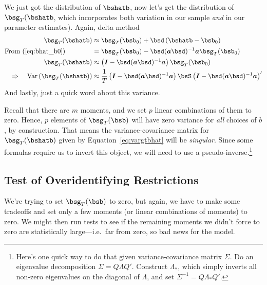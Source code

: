 \documentclass[12pt]{article}
\theoremstyle{plain}
\theoremstyle{definition}
\theoremstyle{remark}
\begin{document}
\begin{enumerate}
    We just got the distribution of $\bshatb$, now let's
    get the distribution of $\bsg_T(\bshatb$,
    which incorporates both variation in our sample \emph{and} in our
    parameter estimates). Again, delta method
    \begin{align}
      \bsg_T(\bshatb)
      &\approx
      \bsg_T(\bsb_0)
      + \bsd
      \left(\bshatb-\bsb_0\right)\notag\\
      \text{From (\ref{eq:bhat_b0})}
      \qquad\qquad
      &=
      \bsg_T(\bsb_0)
      -\bsd(\boldsymbol{a} \bsd)^{-1}
      \boldsymbol{a} \bsg_T(\bsb_0)\notag \\
      \bsg_T(\bshatb)
      &\approx
      \left(\boldsymbol{I}
      -\bsd(\boldsymbol{a} \bsd)^{-1}
      \boldsymbol{a} \right)
      \bsg_T(\bsb_0)\notag\\
      \Rightarrow\quad
      \text{Var}\left(
      \bsg_T(\bshatb)
      \right)
      &\approx
      \frac{1}{T}
      \left(\boldsymbol{I}
      -\bsd(\boldsymbol{a} \bsd)^{-1}
      \boldsymbol{a} \right)
      \bsS
      \left(\boldsymbol{I}
      -\bsd(\boldsymbol{a} \bsd)^{-1}
      \boldsymbol{a} \right)'
      \label{eq:vargtbhat}
    \end{align}
    And lastly, just a quick word about this variance.

    Recall that there are $m$ moments, and we set $p$ linear
    combinations of them to zero. Hence, $p$ elements of
    $\bsg_T(\bsb)$ will have zero variance
    for \emph{all} choices of $b$, by construction. That means the
    variance-covariance matrix for
    $\bsg_T(\bshatb)$ given by
    Equation~\ref{eq:vargtbhat} will be \emph{singular}.  Since some
    formulas require us to invert this object, we will need to use a
    pseudo-inverse.\footnote{Here's one quick way to do that given
      variance-covariance matrix $\Sigma$. Do an eigenvalue
      decomposition $\Sigma = Q\Lambda Q'$. Construct $\Lambda_*$, which
      simply inverts all non-zero eigenvalues on the diagonal of
      $\Lambda$, and set $\Sigma^{-1}=Q\Lambda_*Q'$.}

\end{enumerate}

\subsection{Test of Overidentifying Restrictions}

We're trying to set $\bsg_T(\bsb)$ to zero, but
again, we have to make some tradeoffs and set only a few moments (or
linear combinations of moments) to zero. We might then run tests to see
if the remaining moments we didn't force to zero are statistically
large---i.e.\ far from zero, so bad news for the model.
\end{document}
